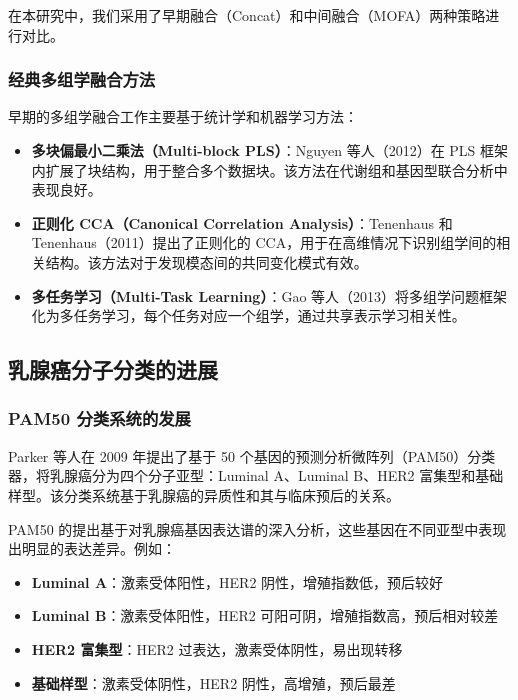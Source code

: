 在本研究中，我们采用了早期融合（Concat）和中间融合（MOFA）两种策略进行对比。

\subsubsection{经典多组学融合方法}

早期的多组学融合工作主要基于统计学和机器学习方法：

\begin{itemize}
    \item \textbf{多块偏最小二乘法（Multi-block PLS）}：Nguyen 等人（2012）在 PLS 框架内扩展了块结构，用于整合多个数据块。该方法在代谢组和基因型联合分析中表现良好。
    
    \item \textbf{正则化 CCA（Canonical Correlation Analysis）}：Tenenhaus 和 Tenenhaus（2011）提出了正则化的 CCA，用于在高维情况下识别组学间的相关结构。该方法对于发现模态间的共同变化模式有效。
    
    \item \textbf{多任务学习（Multi-Task Learning）}：Gao 等人（2013）将多组学问题框架化为多任务学习，每个任务对应一个组学，通过共享表示学习相关性。
\end{itemize}

\subsection{乳腺癌分子分类的进展}

\subsubsection{PAM50 分类系统的发展}

Parker 等人在 2009 年提出了基于 50 个基因的预测分析微阵列（PAM50）分类器，将乳腺癌分为四个分子亚型：Luminal A、Luminal B、HER2 富集型和基础样型。该分类系统基于乳腺癌的异质性和其与临床预后的关系。

PAM50 的提出基于对乳腺癌基因表达谱的深入分析，这些基因在不同亚型中表现出明显的表达差异。例如：

\begin{itemize}
    \item \textbf{Luminal A}：激素受体阳性，HER2 阴性，增殖指数低，预后较好
    \item \textbf{Luminal B}：激素受体阳性，HER2 可阳可阴，增殖指数高，预后相对较差
    \item \textbf{HER2 富集型}：HER2 过表达，激素受体阴性，易出现转移
    \item \textbf{基础样型}：激素受体阴性，HER2 阴性，高增殖，预后最差
\end{itemize}

